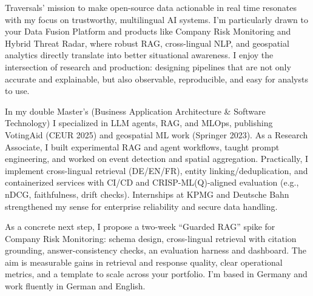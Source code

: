 Traversals’ mission to make open-source data actionable in real time resonates with my focus on trustworthy, multilingual AI systems. I’m particularly drawn to your Data Fusion Platform and products like Company Risk Monitoring and Hybrid Threat Radar, where robust RAG, cross-lingual NLP, and geospatial analytics directly translate into better situational awareness. I enjoy the intersection of research and production: designing pipelines that are not only accurate and explainable, but also observable, reproducible, and easy for analysts to use.

In my double Master’s (Business Application Architecture \& Software Technology) I specialized in LLM agents, RAG, and MLOps, publishing VotingAid (CEUR 2025) and geospatial ML work (Springer 2023). As a Research Associate, I built experimental RAG and agent workflows, taught prompt engineering, and worked on event detection and spatial aggregation. Practically, I implement cross-lingual retrieval (DE/EN/FR), entity linking/deduplication, and containerized services with CI/CD and CRISP-ML(Q)-aligned evaluation (e.g., nDCG, faithfulness, drift checks). Internships at KPMG and Deutsche Bahn strengthened my sense for enterprise reliability and secure data handling.

As a concrete next step, I propose a two-week “Guarded RAG” spike for Company Risk Monitoring: schema design, cross-lingual retrieval with citation grounding, answer-consistency checks, an evaluation harness and dashboard. The aim is measurable gains in retrieval and response quality, clear operational metrics, and a template to scale across your portfolio. I’m based in Germany and work fluently in German and English.